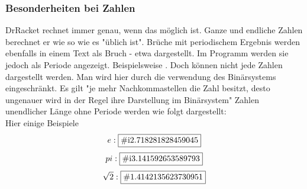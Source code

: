 \subsubsection{Besonderheiten bei Zahlen}
DrRacket rechnet immer genau, wenn das möglich ist. Ganze und endliche Zahlen berechnet er wie so wie es
"üblich ist".
Brüche mit periodischem Ergebnis werden ebenfalls in einem Text als Bruch - etwa  dargestellt. Im Programm werden sie jedoch als Periode angezeigt. Beispielsweise .
Doch können nicht jede Zahlen  dargestellt werden.
Man wird hier durch die verwendung des Binärsystems eingeschränkt. Es gilt "je mehr Nachkommastellen die Zahl besitzt, desto ungenauer wird in der Regel ihre Darstellung im Binärsystem"
Zahlen unendlicher Länge ohne Periode werden wie folgt dargestellt: \\
Hier einige Beispiele
$$e: \fbox{\#i2.718281828459045}$$
$$pi: \fbox{\#i3.141592653589793}$$
$$\sqrt{2}: \fbox{\#1.4142135623730951}$$
$$$$
